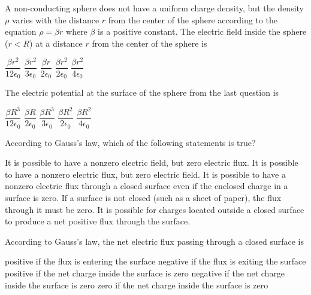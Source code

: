 \documentclass{../../oss-apphys-exam}
\newcounter{last}
\begin{document}


\raggedcolumns

\begin{multicols*}{2}
  \begin{questions}

    \question A non-conducting sphere does not have a uniform charge density,
    but the density $\rho$ varies with the distance $r$ from the center of the
    sphere according to the equation $\rho=\beta r$ where $\beta$ is a positive
    constant. The electric field inside the sphere ($r<R$) at a distance $r$
    from the center of the sphere is
    \begin{choices}
      \choice $\dfrac{\beta r^2}{12\epsilon_0}$
      \choice $\dfrac{\beta r^2}{3\epsilon_0}$
      \choice $\dfrac{\beta r}{2\epsilon_0}$
      \choice $\dfrac{\beta r^2}{2\epsilon_0}$
      \choice $\dfrac{\beta r^2}{4\epsilon_0}$
    \end{choices}
 
    \question The electric potential at the surface of the sphere from the last
    question is
    \begin{choices}
      \choice $\dfrac{\beta R^3}{12\epsilon_0}$
      \choice $\dfrac{\beta R}{2\epsilon_0}$
      \choice $\dfrac{\beta R^3}{3\epsilon_0}$
      \choice $\dfrac{\beta R^2}{2\epsilon_0}$
      \choice $\dfrac{\beta R^2}{4\epsilon_0}$
    \end{choices}

    \question According to Gauss's law, which of the following statements is
    true?
    \begin{choices}
      \choice It is possible to have a nonzero electric field, but zero electric
      flux.
      \choice It is possible to have a nonzero electric flux, but zero electric
      field.
      \choice It is possible to have a nonzero electric flux through a closed
      surface even if the enclosed charge in a surface is zero.
      \choice If a surface is not closed (such as a sheet of paper), the flux
      through it must be zero.
      \choice It is possible for charges located outside a closed surface to
      produce a net positive flux through the surface.
    \end{choices}
    \columnbreak
    
    \question According to Gauss's law, the net electric flux passing through a
    closed surface is
    \begin{choices}
      \choice positive if the flux is entering the surface
      \choice negative if the flux is exiting the surface
      \choice positive if the net charge inside the surface is zero
      \choice negative if the net charge inside the surface is zero
      \choice zero if the net charge inside the surface is zero
    \end{choices}
    \vspace{.7in}
    

\end{questions}
\end{multicols*}
\end{document}
